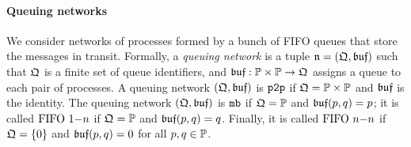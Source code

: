 
\paragraph{\bf Queuing networks}
We consider networks of processes formed by a bunch of FIFO queues that store the messages in transit. 
Formally, a \emph{queuing network} is a tuple $\mathfrak{n}=(\mathfrak{Q},\mathfrak{buf})$ such that 
$\mathfrak{Q}$ is a finite set of queue identifiers, and
$\mathfrak{buf}:\mathbb{P}\times\mathbb{P}\to \mathfrak{Q}$ assigns a queue to each 
pair of processes. 
A queuing network $(\mathfrak{Q},\mathfrak{buf})$ is $\mathtt{p2p}$ if 
$\mathfrak{Q}=\mathbb{P}\times\mathbb{P}$ and $\mathfrak{buf}$ is the identity.
The queuing network $(\mathfrak{Q},\mathfrak{buf})$ is $\mathtt{mb}$ if 
$\mathfrak{Q}=\mathbb{P}$ and $\mathfrak{buf}(p,q)=p$; it is called $\text{FIFO } 1\mathsf{-}n$ if
$\mathfrak{Q}=\mathbb{P}$ and $\mathfrak{buf}(p,q)=q$. Finally, it is called
$\text{FIFO } n\mathsf{-}n$ if $\mathfrak{Q}=\{0\}$ and $\mathfrak{buf}(p,q)=0$ for all $p,q\in\mathbb{P}$.

